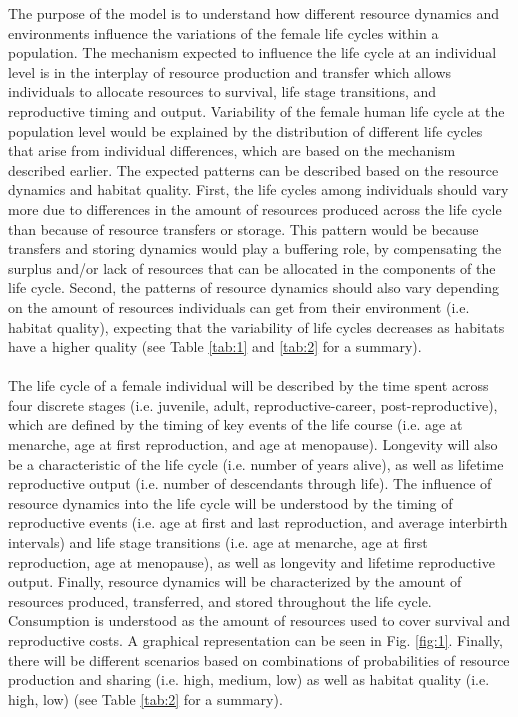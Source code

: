\documentclass{article}
\begin{document}
The purpose of the model is to understand how different resource dynamics and environments influence the variations of the female life cycles within a population. The mechanism expected to influence the life cycle at an individual level is in the interplay of resource production and transfer which allows individuals to allocate resources to survival, life stage transitions, and reproductive timing and output. Variability of the female human life cycle at the population level would be explained by the distribution of different life cycles that arise from individual differences, which are based on the mechanism described earlier. The expected patterns can be described based on the resource dynamics and habitat quality. First, the life cycles among individuals should vary more due to differences in the amount of resources produced across the life cycle than because of resource transfers or storage. This pattern would be because transfers and storing dynamics would play a buffering role, by compensating the surplus and/or lack of resources that can be allocated in the components of the life cycle. Second, the patterns of resource dynamics should also vary depending on the amount of resources individuals can get from their environment (i.e. habitat quality), expecting that the variability of life cycles decreases as habitats have a higher quality (see Table \ref{tab:1} and \ref{tab:2} for a summary).
\\\\
The life cycle of a female individual will be described by the time spent across four discrete stages (i.e. juvenile, adult, reproductive-career, post-reproductive), which are defined by the timing of key events of the life course (i.e. age at menarche, age at first reproduction, and age at menopause). Longevity will also be a characteristic of the life cycle (i.e. number of years alive), as well as lifetime reproductive output (i.e. number of descendants through life). The influence of resource dynamics into the life cycle will be understood by the timing of reproductive events (i.e. age at first and last reproduction, and average interbirth intervals) and life stage transitions (i.e. age at menarche, age at first reproduction, age at menopause), as well as longevity and lifetime reproductive output. Finally, resource dynamics will be characterized by the amount of resources produced, transferred, and stored throughout the life cycle. Consumption is understood as the amount of resources used to cover survival and reproductive costs. A graphical representation can be seen in Fig. \ref{fig:1}. Finally, there will be different scenarios based on combinations of probabilities of resource production and sharing (i.e. high, medium, low) as well as habitat quality (i.e. high, low) (see Table \ref{tab:2} for a summary).
\end{document}
